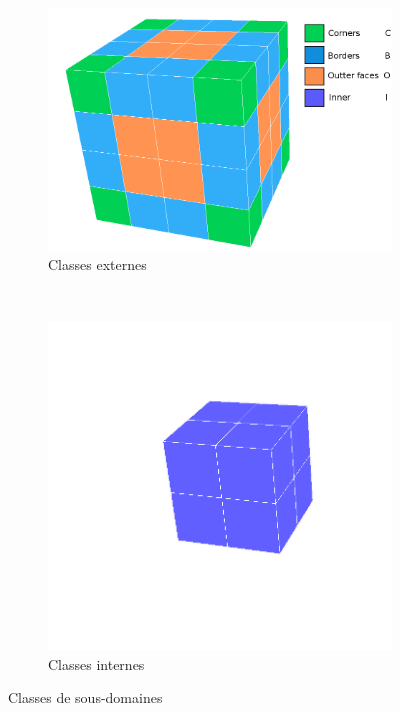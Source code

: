 \begin{figure}[!ht]
  \centering
  \begin{subfigure}[b]{0.5\textwidth}
    \centering
    \includegraphics[scale=0.25]{figures/ext-classes.png}
    \caption{\label{fig:ext-classes}Classes externes}
  \end{subfigure}%
  ~
  \begin{subfigure}[b]{0.5\textwidth}
    \centering
    \includegraphics[scale=0.25]{figures/int-classes.png}
    \caption{\label{fig:int-classes}Classes internes}
  \end{subfigure}
  \caption{\label{fig:classes}Classes de sous-domaines}
\end{figure}



